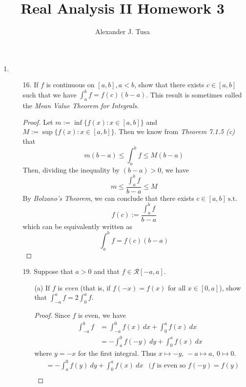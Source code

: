 \documentclass[12pt,letterpaper]{article}
\author{Alexander J. Tusa}
\title{Real Analysis II Homework 3}
\newcommand{\st}{\ \text{s.t.}\ }
\theoremstyle{case}
\theoremstyle{definition}
\begin{document}
	\maketitle
	\begin{enumerate}
		\item 
		\begin{enumerate}
			\item[16.] If $f$ is continuous on $[a,b],a<b$, show that there exists $c \in [a,b]$ such that we have $\displaystyle\int_{a}^{b}f=f(c)(b-a)$. This result is sometimes called the \textit{Mean Value Theorem for Integrals}.
			\begin{proof}
				Let $m:=\inf \{f(x) : x \in [a,b]\}$ and $M:=\sup \{f(x): x \in [a,b]\}$. Then we know from \textit{Theorem 7.1.5 (c)} that
				\[m(b-a) \leq \int_{a}^{b} f \leq M(b-a)\]
				Then, dividing the inequality by $(b-a) > 0$, we have
				\[m \leq \frac{\int_{a}^{b} f}{b-a} \leq M\]
				By \textit{Bolzano's Theorem}, we can conclude that there exists $c \in [a,b] \st$
				\[f(c):=\frac{\int_{a}^{b}f}{b-a}\]
				which can be equivalently written as
				\[\int_{a}^{b} f = f(c)(b-a)\]
			\end{proof}
			\item[19.] Suppose that $a>0$ and that $f \in \mathcal{R}[-a,a]$.
			\begin{enumerate}
				\item[(a)] If $f$ is \textit{even} (that is, if $f(-x)=f(x)$ for all $x \in [0,a]$), show that $\displaystyle\int_{-a}^{a}f=2\int_{0}^{a}f$.
				\begin{proof}
					Since $f$ is even, we have
					\begin{align*}
						\int_{-a}^{b} f &= \int_{-a}^{0} f(x)\ dx + \int_{0}^{a} f(x)\ dx \\
						&= -\int_{a}^{0} f(-y)\ dy + \int_{0}^{a} f(x)\ dx
					\end{align*}
					where $y=-x$ for the first integral. Thus $x \mapsto -y,\ -a\mapsto a,\ 0 \mapsto 0$.
					\begin{align*}
						&= -\int_{a}^{0} f(y)\ dy + \int_{0}^{a} f(x)\ dx &\text{($f$ is even so $f(-y)=f(y)$} \\

\end{align*}
\end{proof}
\end{enumerate}
\end{enumerate}
\end{enumerate}
\end{document}
